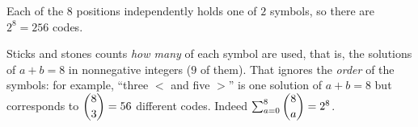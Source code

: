 Each of the $8$ positions independently holds one of $2$ symbols, so there are $2^8=\boxed{256}$ codes.

Sticks and stones counts \emph{how many} of each symbol are used, that is, the solutions of $a+b=8$ in nonnegative integers ($9$ of them). That ignores the \emph{order} of the symbols: for example, ``three $<$ and five $>$'' is one solution of $a+b=8$ but corresponds to $\dbinom83=56$ different codes. Indeed $\sum_{a=0}^{8}\dbinom8a=2^8$.
